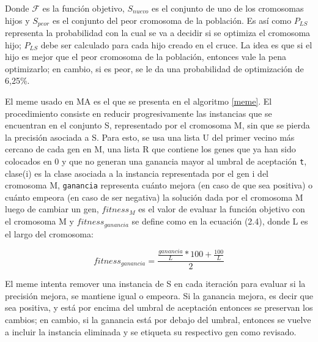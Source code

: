 Donde $\mathcal{F}$ es la función objetivo, $S_{nuevo}$ es el conjunto de uno de los cromosomas hijos y $S_{peor}$ es el conjunto del peor cromosoma de la población. Es así como $P_{LS}$ representa la probabilidad con la cual se va a decidir si se optimiza el cromosoma hijo; $P_{LS}$ debe ser calculado para cada hijo creado en el cruce. La idea es que si el hijo es mejor que el peor cromosoma de la población, entonces vale la pena optimizarlo; en cambio, si es peor, se le da una probabilidad de optimización de 6,25\%.

El meme usado en MA es el que se presenta en el algoritmo \ref{meme}. El procedimiento consiste en reducir progresivamente las instancias que se encuentran en el conjunto S, representado por el cromosoma M, sin que se pierda la precisión asociada a S. Para esto, se usa una lista U del primer vecino más cercano de cada gen en M, una lista R que contiene los genes que ya han sido colocados en 0 y que no generan una ganancia mayor al umbral de aceptación \texttt{t}, clase(i) es la clase asociada a la instancia representada por el gen i del cromosoma M, \texttt{ganancia} representa cuánto mejora (en caso de que sea positiva) o cuánto empeora (en caso de ser negativa) la solución dada por el cromosoma M luego de cambiar un gen, $fitness_M$ es el valor de evaluar la función objetivo con el cromosoma M y $fitness_{ganancia}$ se define como en la ecuación (2.4), donde L es el largo del cromosoma:

\begin{equation}
fitness_{ganancia} = \frac{\frac{ganancia}{L}*100 + \frac{100}{L}}{2}
\end{equation}  

El meme intenta remover una instancia de S en cada iteración para evaluar si la precisión mejora, se mantiene igual o empeora. Si la ganancia mejora, es decir que sea positiva, y está por encima del umbral de aceptación entonces se preservan los cambios; en cambio, si la ganancia está por debajo del umbral, entonces se vuelve a incluir la instancia eliminada y se etiqueta su respectivo gen como revisado.
 
